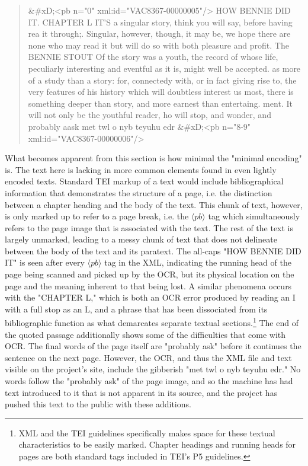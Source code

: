 \begin{quote}
\&\#xD;<pb n="0" xml:id="VAC8367-00000005"/>   HOW BENNIE DID IT. CHAPTER L IT'S a singular story,     think you will say, before having rea it through;. Singular, however, though, it may be, we hope there are none who may read it but will do so with both pleasure and profit. The BENNIE STOUT Of the story was a youth, the record of whose life, peculiarly interesting and eventful as it is, might well be accepted. as more of a study than a story: for, connectedy with, or in fact giving rise to, the very features of his history which will doubtless interest us most, there is something deeper than story, and more earnest than entertaing. ment. It will not only be the youthful reader,  ho will stop, and wonder, and probably aask met   twl  o  nyb teyuhu    edr   \&\#xD;<pb n="8-9" 
xml:id="VAC8367-00000006"/>\autocite{matthew_merchant_how_nodate}
\end{quote}

What becomes apparent from this section is how minimal the "minimal encoding" is. The text here is lacking in more common elements found in even lightly encoded texts. Standard TEI markup of a text would include bibliographical information that demonstrates the structure of a page, i.e. the distinction between a chapter heading and the body of the text. This chunk of text, however, is only marked up to refer to a page break, i.e. the $\langle pb \rangle$ tag which simultaneously refers to the page image that is associated with the text. The rest of the text is largely unmarked, leading to a messy chunk of text that does not delineate between the body of the text and its paratext. The all-caps "HOW BENNIE DID IT" is seen after every $\langle pb \rangle$ tag in the XML, indicating the running head of the page being scanned and picked up by the OCR, but its physical location on the page and the meaning inherent to that being lost. A similar phenomena occurs with the "CHAPTER L," which is both an OCR error produced by reading an I with a full stop as an L, and a phrase that has been dissociated from its bibliographic function as what demarcates separate textual sections.\footnote{XML and the TEI guidelines specifically makes space for these textual characteristics to be easily marked. Chapter headings and running heads for pages are both standard tags included in TEI's P5 guidelines.} The end of the quoted passage additionally shows some of the difficulties that come with OCR. The final words of the page itself are "probably ask" before it continues the sentence on the next page. However, the OCR, and thus the XML file and text visible on the project's site, include the gibberish "met   twl  o  nyb teyuhu    edr." No words follow the "probably ask" of the page image, and so the machine has had text introduced to it that is not apparent in its source, and the project has pushed this text to the public with these additions. 

